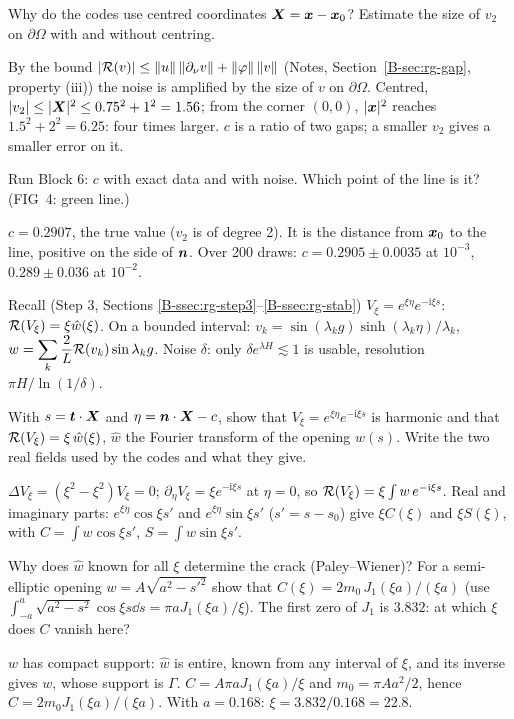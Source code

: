 \q Why do the codes use centred coordinates $\bm{X}=\bm{x}-\bm{x}_0$? Estimate
the size of $v_2$ on $\partial\Omega$ with and without centring.
\begin{answer}
By the bound $|\mathcal{R}(v)|\le\|u\|\,\|\partial_\nu v\|+\|\varphi\|\,\|v\|$ (Notes,
Section~\ref{B-sec:rg-gap}, property (iii)) the noise is amplified by the
size of $v$ on $\partial\Omega$. Centred, $|v_2|\le|\bm{X}|^2\le
0.75^2+1^2=1.56$; from the corner $(0,0)$, $|\bm{x}|^2$ reaches $1.5^2+2^2=6.25$:
four times larger. $c$ is a ratio of two gaps; a smaller $v_2$ gives
a smaller error on it.
\end{answer}

\qc Run Block 6: $c$ with exact data and with noise. Which point of the line
is it? (FIG~4: green line.)
\begin{answer}
$c=0.2907$, the true value ($v_2$ is of degree 2). It is the distance from
$\bm{x}_0$ to the line, positive on the side of $\bm{n}$. Over 200 draws:
$c=0.2905\pm0.0035$ at $10^{-3}$, $0.289\pm0.036$ at $10^{-2}$.
\end{answer}

\begin{gbox}{Recall (Step 3, Sections \ref{B-ssec:rg-step3}--\ref{B-ssec:rg-stab})}
$V_\xi=e^{\xi\eta}e^{-\mathrm i\xi s}$: $\mathcal{R}(V_\xi)=\xi\hat w(\xi)$. On a bounded
interval: $v_k=\sin(\lambda_kg)\sinh(\lambda_k\eta)/\lambda_k$,
$\displaystyle w=\sum_k\frac2L\mathcal{R}(v_k)\sin\lambda_kg$. Noise $\delta$: only
$\delta e^{\lambda H}\lesssim1$ is usable, resolution $\pi H/\ln(1/\delta)$.
\end{gbox}

\q With $s=\bm{t}\cdot\bm{X}$ and $\eta=\bm{n}\cdot\bm{X}-c$, show that
$V_\xi=e^{\xi\eta}e^{-\mathrm i\xi s}$ is harmonic and that
$\mathcal{R}(V_\xi)=\xi\,\hat w(\xi)$, $\hat w$ the Fourier transform of the
opening $w(s)$. Write the two real fields used by the codes and what they
give.
\begin{answer}
$\Delta V_\xi=(\xi^2-\xi^2)V_\xi=0$; $\partial_\eta V_\xi=\xi e^{-\mathrm i\xi s}$ at
$\eta=0$, so $\mathcal{R}(V_\xi)=\xi\int w\,e^{-\mathrm i\xi s}$. Real and imaginary
parts: $e^{\xi\eta}\cos\xi s'$ and $e^{\xi\eta}\sin\xi s'$ ($s'=s-s_0$)
give $\xi C(\xi)$ and $\xi S(\xi)$, with $\displaystyle C=\int w\cos\xi s'$,
$\displaystyle S=\int w\sin\xi s'$.
\end{answer}

\q Why does $\hat w$ known for all $\xi$ determine the crack
(Paley--Wiener)? For a semi-elliptic opening $w=A\sqrt{a^2-s'^2}$ show that
$C(\xi)=2m_0\,J_1(\xi a)/(\xi a)$ (use
$\displaystyle \int_{-a}^a\sqrt{a^2-s^2}\cos\xi s\dd s=\pi aJ_1(\xi a)/\xi$). The
first zero of $J_1$ is $3.832$: at which $\xi$ does $C$ vanish here?
\begin{answer}
$w$ has compact support: $\hat w$ is entire, known from any interval of
$\xi$, and its inverse gives $w$, whose support is $\Gamma$.
$C=A\pi aJ_1(\xi a)/\xi$ and $m_0=\pi Aa^2/2$, hence $C=2m_0J_1(\xi a)/(\xi
a)$. With $a=0.168$: $\xi=3.832/0.168=22.8$.
\end{answer}

